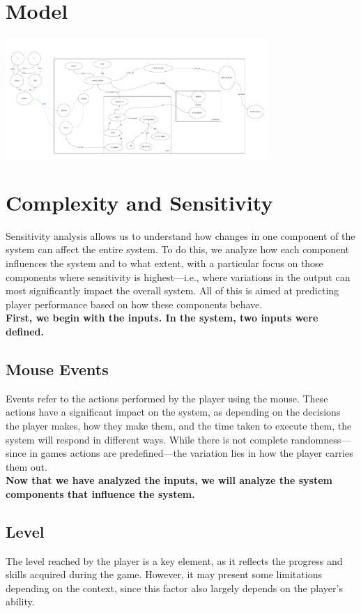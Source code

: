 \documentclass{article}
\begin{document}
\section*{Model}
\begin{center}
    \includegraphics[width=0.75\textwidth]{src/IO.pdf}
  \end{center}

  \section*{Complexity and Sensitivity}
  Sensitivity analysis allows us to understand how changes in one component of the system can affect the entire system. To do this, we analyze how each component influences the system and to what extent, with a particular focus on those components where sensitivity is highest—i.e., where variations in the output can most significantly impact the overall system. All of this is aimed at predicting player performance based on how these components behave.\\
  
  \textbf{First, we begin with the inputs. In the system, two inputs were defined.}
  
  \subsection*{Mouse Events}
  Events refer to the actions performed by the player using the mouse. These actions have a significant impact on the system, as depending on the decisions the player makes, how they make them, and the time taken to execute them, the system will respond in different ways. While there is not complete randomness—since in games actions are predefined—the variation lies in how the player carries them out.
  \\
  
  \textbf{Now that we have analyzed the inputs, we will analyze the system components that influence the system.}
  
  \subsection*{Level}
  The level reached by the player is a key element, as it reflects the progress and skills acquired during the game. However, it may present some limitations depending on the context, since this factor also largely depends on the player's ability.
  
\end{document}

